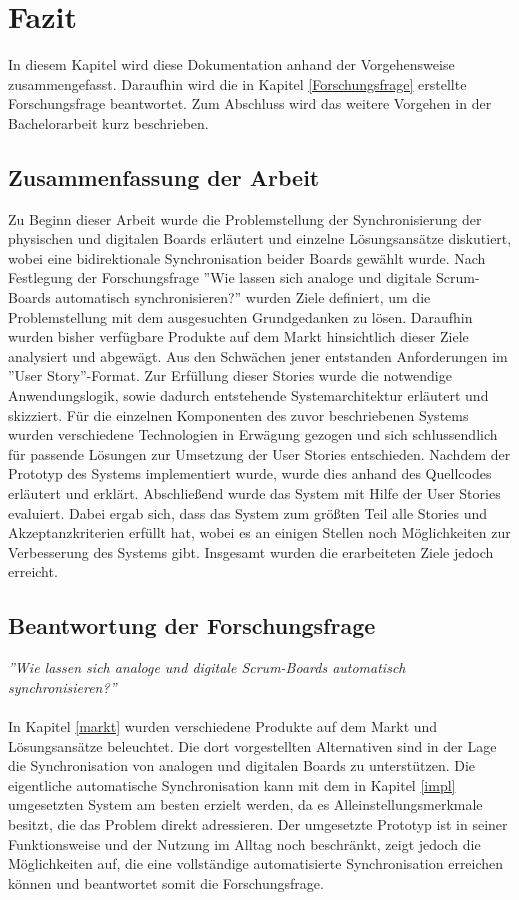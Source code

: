 \documentclass[12pt,titlepage]{scrartcl}
\begin{document}
	\section{Fazit}
	In diesem Kapitel wird diese Dokumentation anhand der Vorgehensweise zusammengefasst. Daraufhin wird die in Kapitel \ref{Forschungsfrage} erstellte Forschungsfrage beantwortet. Zum Abschluss wird das weitere Vorgehen in der Bachelorarbeit kurz beschrieben.
		\subsection{Zusammenfassung der Arbeit}
	Zu Beginn dieser Arbeit wurde die Problemstellung der Synchronisierung der physischen und digitalen Boards erläutert und einzelne Lösungsansätze diskutiert, wobei eine bidirektionale Synchronisation beider Boards gewählt wurde. Nach Festlegung der Forschungsfrage ''Wie lassen sich analoge und digitale Scrum-Boards automatisch synchronisieren?'' wurden Ziele definiert, um die Problemstellung mit dem ausgesuchten Grundgedanken zu lösen. Daraufhin wurden bisher verfügbare Produkte auf dem Markt hinsichtlich dieser Ziele analysiert und abgewägt. Aus den Schwächen jener entstanden Anforderungen im ''User Story''-Format. Zur Erfüllung dieser Stories wurde die notwendige Anwendungslogik, sowie dadurch entstehende Systemarchitektur erläutert und skizziert. Für die einzelnen Komponenten des zuvor beschriebenen Systems wurden verschiedene Technologien in Erwägung gezogen und sich schlussendlich für passende Lösungen zur Umsetzung der User Stories entschieden. Nachdem der Prototyp des Systems implementiert wurde, wurde dies anhand des Quellcodes erläutert und erklärt. Abschließend wurde das System mit Hilfe der User Stories evaluiert. Dabei ergab sich, dass das System zum größten Teil alle Stories und Akzeptanzkriterien erfüllt hat, wobei es an einigen Stellen noch Möglichkeiten zur Verbesserung des Systems gibt. Insgesamt wurden die erarbeiteten Ziele jedoch erreicht.
	\subsection{Beantwortung der Forschungsfrage}
	\textit{''Wie lassen sich analoge und digitale Scrum-Boards automatisch synchronisieren?''} \\ \\
	In Kapitel \ref{markt} wurden verschiedene Produkte auf dem Markt und Lösungsansätze beleuchtet. Die dort vorgestellten Alternativen sind in der Lage die Synchronisation von analogen und digitalen Boards zu unterstützen. Die eigentliche automatische Synchronisation kann mit dem in Kapitel \ref{impl} umgesetzten System am besten erzielt werden, da es Alleinstellungsmerkmale besitzt, die das Problem direkt adressieren. Der umgesetzte Prototyp ist in seiner Funktionsweise und der Nutzung im Alltag noch beschränkt, zeigt jedoch die Möglichkeiten auf, die eine vollständige automatisierte Synchronisation erreichen können und beantwortet somit die Forschungsfrage.
\end{document}
